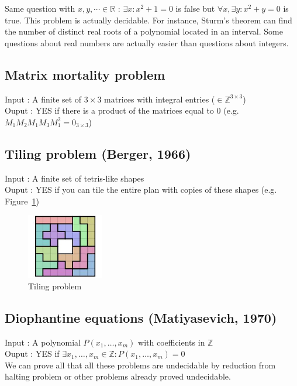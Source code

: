 Same question with $x,y,\cdots \in \mathbb{R}$ :  $\exists x : x^2+1=0$ is false but  $\forall x, \exists y : x^2+y=0$ is true. This problem is actually decidable. For instance, Sturm's theorem can find the number of distinct real roots of a polynomial located in an interval. Some questions about real numbers are actually easier than questions about integers.

\subsection{Matrix mortality problem}
Input : A finite set of $3\times3$ matrices with integral entries ($\in \mathbb{Z}^{3\times3}$)\\
Ouput : YES if there is a product of the matrices equal to $0$ (e.g. $M_1M_2M_1M_3M_1^2 = 0_{3\times3}$)

\subsection{Tiling problem (Berger, 1966)}
Input : A finite set of tetris-like shapes \\
Ouput : YES if you can tile the entire plan with copies of these shapes (e.g. Figure~\ref{Tiling})
\begin{figure}[!h]
                 \centering\includegraphics[width=0.3\textwidth]{images/pentomio.png}
         	\caption{Tiling problem}
        		\label{Tiling}
\end{figure}

\subsection{Diophantine equations (Matiyasevich, 1970)}
Input : A polynomial $P(x_1,\ldots, x_m)$ with coefficients in $\mathbb{Z}$ \\
Ouput : YES if $\exists x_1,\ldots, x_m \in \mathbb{Z} : P(x_1,\ldots, x_m) = 0$ \\


We can prove all that all these problems are undecidable by reduction from halting problem or other problems already proved undecidable.
